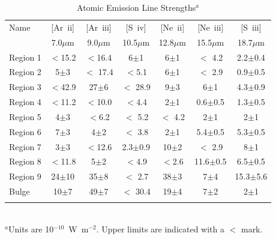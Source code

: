 \begin{table}
 \centering
 \begin{minipage}{100mm}
\caption{Atomic Emission Line Strengths$^a$}
  \begin{tabular}{l c c  c  c  c  c  }
  \hline{Name  }&{[Ar~{\sc ii}] }&{[Ar~{\sc iii}]  }&{[S~{\sc iv}]}&{[Ne~{\sc ii}]   }&{[Ne~{\sc iii}]   }&{[S~{\sc iii}]  }\\
{}&{\tiny{7.0$\mu$m} }&{\tiny{9.0$\mu$m }}&{\tiny{10.5$\mu$m}}&{\tiny{12.8$\mu$m  }}&{\tiny{15.5$\mu$m } }&{\tiny{18.7$\mu$m }} 
   \\
 \hline 
 
Region 1 &    $<$15.2                 & $<$16.4                 & 6$\pm$1                 & 6$\pm$1                 & $<$ 4.2                 & 2.2$\pm$0.4                \\
Region 2 &    5$\pm$3                 & $<$ 17.4               & $<$5.1                    & 6$\pm$1                 & $<$ 2.9                 & 0.9$\pm$0.5                 \\
Region 3 &    $<$42.9                 & 27$\pm$6              & $<$ 28.9                & 9$\pm$3                 & 6$\pm$1               & 4.3$\pm$0.9                 \\
Region 4 &    $<$11.2                 & $<$10.0                 & $<$4.4                    & 2$\pm$1                 & 0.6$\pm$0.5        & 1.3$\pm$0.5                 \\
Region 5 &    4$\pm$3                 & $<$6.2                   & $<$ 5.2                 & $<$ 4.2                     & 2$\pm$1               & 2$\pm$1                 \\
Region 6 &    7$\pm$3                & 4$\pm$2                 & $<$ 3.8                 & 2$\pm$1                  & 5.4$\pm$0.5         & 5.3$\pm$0.5                 \\
Region 7 &    3$\pm$3                 & $<$12.6                 & 2.3$\pm$0.9        & 10$\pm$2                & $<$ 2.9                 & 8$\pm$1                \\
Region 8 &    $<$11.8                  & 5$\pm$2                & $<$4.9                  & $<$2.6                       & 11.6$\pm$0.5     & 6.5$\pm$0.5                 \\
Region 9 &    24$\pm$10             & 35$\pm$8             & $<$ 2.7                 & 38$\pm$3                 & 7$\pm$4               & 15.3$\pm$5.6                 \\
Bulge &          10$\pm$7               & 49$\pm$7              & $<$ 30.4               & 19$\pm$4                 & 7$\pm$2               & 2$\pm$1      \\           

\hline
 \label{Atomic}
\end{tabular}\\
{ $^a$Units are 10$^{-10}$~W~m$^{-2}$. Upper limits are indicated with a $<$ mark.  }

\end{minipage}
\end{table}
